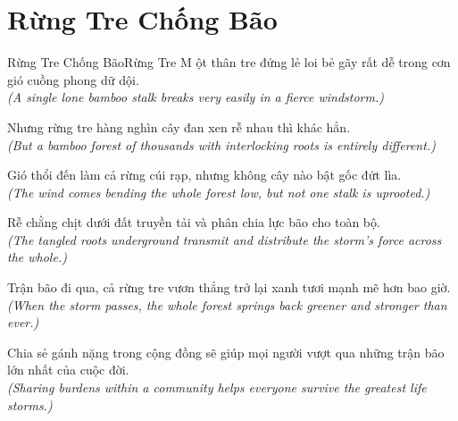 \section{Rừng Tre Chống Bão}
\begin{truyen}{Rừng Tre Chống Bão}{Rừng Tre}
M ột thân tre đứng lẻ loi bẻ gãy rất dễ trong cơn gió cuồng phong dữ dội.\\
\textit{(A single lone bamboo stalk breaks very easily in a fierce windstorm.)}

Nhưng rừng tre hàng nghìn cây đan xen rễ nhau thì khác hẳn.\\
\textit{(But a bamboo forest of thousands with interlocking roots is entirely different.)}

Gió thổi đến làm cả rừng cúi rạp, nhưng không cây nào bật gốc đứt lìa.\\
\textit{(The wind comes bending the whole forest low, but not one stalk is uprooted.)}

Rễ chằng chịt dưới đất truyền tải và phân chia lực bão cho toàn bộ.\\
\textit{(The tangled roots underground transmit and distribute the storm's force across the whole.)}

Trận bão đi qua, cả rừng tre vươn thẳng trở lại xanh tươi mạnh mẽ hơn bao giờ.\\
\textit{(When the storm passes, the whole forest springs back greener and stronger than ever.)}

\end{truyen}
\begin{baihoc}
  Chia sẻ gánh nặng trong cộng đồng sẽ giúp mọi người vượt qua những trận bão lớn nhất của cuộc đời.\\
  \textit{(Sharing burdens within a community helps everyone survive the greatest life storms.)}
\end{baihoc}

